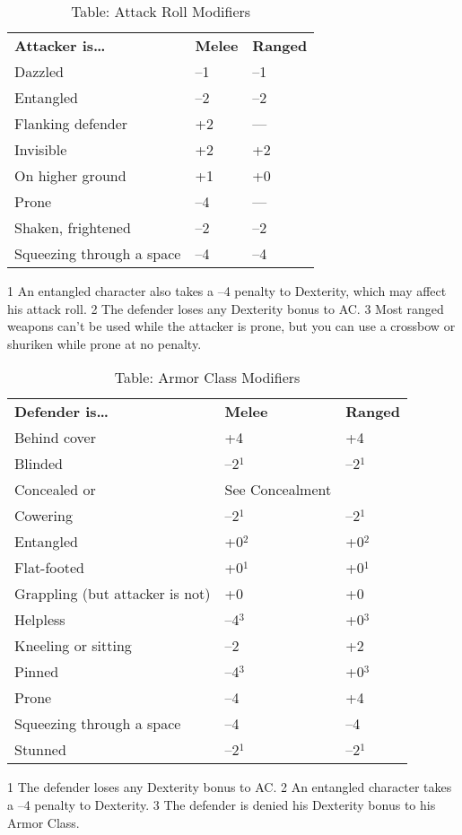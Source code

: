 \begin{table}[]
\sffamily
\caption{Table: Attack Roll Modifiers}
\begin{tabular}{lll}
\textbf{Attacker is…} & \textbf{Melee} & \textbf{Ranged}\\
Dazzled & –1 & –1\\
Entangled & –2 & –2\\
Flanking defender & +2 & —\\
Invisible & +2 & +2\\
On higher ground & +1 & +0\\
Prone & –4 & —\\
Shaken, frightened & –2 & –2\\
Squeezing through a space & –4 & –4\\
\end{tabular}
1 An entangled character also takes a --4 penalty to Dexterity, which may affect his attack roll.
2 The defender loses any Dexterity bonus to AC.
3 Most ranged weapons can't be used while the attacker is prone, but you can use a crossbow or shuriken while prone at no penalty.
\end{table}
\begin{table}[]
\sffamily
\caption{Table: Armor Class Modifiers}
\begin{tabular}{lll}
\textbf{Defender is…} & \textbf{Melee} & \textbf{Ranged}\\
Behind cover & +4 & +4\\
Blinded & –2\(^{1}\) & –2\(^{1}\)\\
Concealed or  & See Concealment\\
Cowering & –2\(^{1}\) & –2\(^{1}\)\\
Entangled & +0\(^{2}\) & +0\(^{2}\)\\
Flat-footed & +0\(^{1}\) & +0\(^{1}\)\\
Grappling (but attacker is not) & +0 & +0\\
Helpless & –4\(^{3}\) & +0\(^{3}\)\\
Kneeling or sitting & –2 & +2\\
Pinned & –4\(^{3}\) & +0\(^{3}\)\\
Prone & –4 & +4\\
Squeezing through a space & –4 & –4\\
Stunned & –2\(^{1}\) & –2\(^{1}\)\\
\end{tabular}
1 The defender loses any Dexterity bonus to AC.
2 An entangled character takes a --4 penalty to Dexterity.
3 The defender is denied his Dexterity bonus to his Armor Class.
\end{table}


